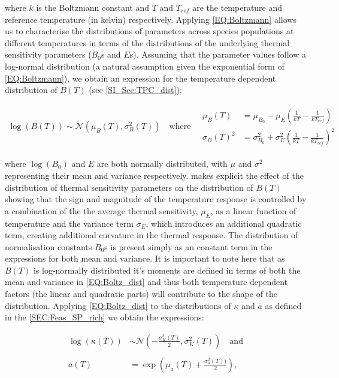 \documentclass{article}
\begin{document}
where $k$ is the Boltzmann constant and $T$ and $T_{ref}$ are the temperature and reference temperature (in kelvin) respectively. Applying \cref{EQ:Boltzmann} allows us to characterise the distributions of parameters across species populations at different temperatures in terms of the distributions of the underlying thermal sensitivity parameters ($B_0$s and $E$s). Assuming that the parameter values follow a log-normal distribution (a natural assumption given the exponential form of \cref{EQ:Boltzmann}), we obtain an expression for the temperature dependent distribution of $B(T)$ (see \cref{SI_Sec:TPC_dist}):

\begin{align} \label{EQ:Boltz_dist}
    \log(B(T)) \sim \mathcal{N}\left(\mu_{B}(T) , \sigma_{B}^2(T) \right) 
    \quad \text{where} \quad
    \begin{array}{cc}
        \mu_B(T) &= \mu_{B_0} - \mu_{E} \left(\frac{1}{kT} - \frac{1}{k T_{ref} }\right)  \\
        \sigma_{B}(T)^2 &= \sigma_{B_0}^2 + \sigma_{E}^2 \left(\frac{1}{kT} - \frac{1}{k T_{ref} }\right)^2
    \end{array}
\end{align}

where $\log(B_0)$ and $E$ are both normally distributed, with $\mu$ and $\sigma^2$ representing their mean and variance respectively.  makes explicit the effect of the distribution of thermal sensitivity parameters on the distribution of $B(T)$ showing that the sign and magnitude of the temperature response is controlled by a combination of the the average thermal sensitivity, $\mu_E$, as a linear function of temperature and the variance term $\sigma_E$, which introduces an additional quadratic term, creating additional curvature in the thermal response. The distribution of normalisation constants $B_0$s is present simply as an constant term in the expressions for both mean and variance. It is important to note here that as $B(T)$ is log-normally distributed it's moments are defined in terms of both the mean and variance in \cref{EQ:Boltz_dist} and thus both temperature dependent factors (the linear and quadratic parts) will contribute to the shape of the distribution. Applying \cref{EQ:Boltz_dist} to the distributions of $\kappa$ and $\bar{a}$ as defined in the \cref{SEC:Feas_SP_rich} we obtain the expressions:

\begin{align} \label{EQ:Trait_distributions}
        \log(\kappa(T)) &\sim \mathcal{N}\left( -\frac{\sigma_{K}^2(T)}{2} , \sigma_{K}^2(T) \right) \quad \text{and} \\ \nonumber \\
        \bar{a}(T) &= \exp \left(\mu_a(T) + \frac{\sigma_a^2(T))}{2} \right),
\end{align}
\end{document}
